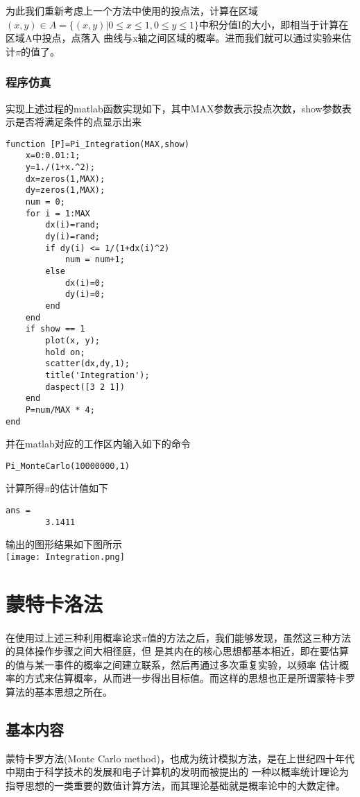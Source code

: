 \documentclass[UTF8]{ctexart}
\begin{document}
        为此我们重新考虑上一个方法中使用的投点法，计算在区域$(x,y) \in A = \{(x,y)|0 \leq x \leq 1,0\leq y\leq 1\}$中积分值I的大小，即相当于计算在区域A中投点，点落入
    曲线与x轴之间区域的概率。进而我们就可以通过实验来估计$\pi$的值了。
    \subsubsection{程序仿真}
        实现上述过程的matlab函数实现如下，其中MAX参数表示投点次数，show参数表示是否将满足条件的点显示出来
        \begin{lstlisting}[title=Function for Integration in Square, frame=shadowbox]
function [P]=Pi_Integration(MAX,show)
    x=0:0.01:1;
    y=1./(1+x.^2);
    dx=zeros(1,MAX);
    dy=zeros(1,MAX);
    num = 0;
    for i = 1:MAX
        dx(i)=rand;
        dy(i)=rand;
        if dy(i) <= 1/(1+dx(i)^2)
            num = num+1;
        else
            dx(i)=0;
            dy(i)=0;
        end
    end
    if show == 1
        plot(x, y);
        hold on;
        scatter(dx,dy,1);
        title('Integration');
        daspect([3 2 1])
    end
    P=num/MAX * 4;
end
        \end{lstlisting}
    并在matlab对应的工作区内输入如下的命令
    \begin{lstlisting}[title=Simulation for Integration in Square, frame=shadowbox]
Pi_MonteCarlo(10000000,1)
    \end{lstlisting}
    计算所得$\pi$的估计值如下
    \begin{lstlisting}[title=Result for Sector in Square, frame=shadowbox]
ans =
        3.1411  
    \end{lstlisting}
    输出的图形结果如下图所示\\
    \texttt{[image: Integration.png]}

    \section{蒙特卡洛法}
    \paragraph{}
        在使用过上述三种利用概率论求$\pi$值的方法之后，我们能够发现，虽然这三种方法的具体操作步骤之间大相径庭，但
    是其内在的核心思想都基本相近，即在要估算的值与某一事件的概率之间建立联系，然后再通过多次重复实验，以频率
    估计概率的方式来估算概率，从而进一步得出目标值。而这样的思想也正是所谓蒙特卡罗算法的基本思想之所在。


    \subsection{基本内容}
        蒙特卡罗方法(Monte Carlo method)，也成为统计模拟方法，是在上世纪四十年代中期由于科学技术的发展和电子计算机的发明而被提出的
    一种以概率统计理论为指导思想的一类重要的数值计算方法，而其理论基础就是概率论中的大数定律。
\end{document}
